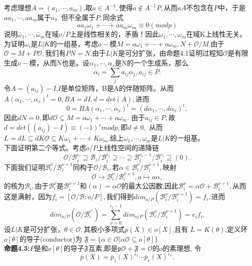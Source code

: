 \documentclass[UTF8]{article}
\begin{document}
考虑理想$A=(a_{1},\cdots,a_{m})$,取$a\in A^{-1},$使得$a\notin A^{-1}P,$从而$aA$不包含在$P$中，于是$aa_{1},\cdots,aa_{m}$属于o，但不全属于$P,$同余式
$$
aa_{1}\omega_{1}+\cdots+aa_{m}\omega_{m}\equiv 0 (mod p)
$$
说明$\bar{\omega}_{1},\cdots ,\bar{\omega}_{m}$在域$o/P$上是线性相关的，矛盾！因此$\omega_{1},\cdots,\omega_{m}$在域K上线性无关。\\
为证明$\omega_{i}$是$L|K$的一组基，考虑$o-$模$M=o\omega_{1}+\cdots+o\omega_{m},N+\mathcal{O}/M.$由于$\mathcal{O}=M+P\mathcal{O},$我们有$PN=N.$由于$L|K$是可分扩张，由命题4.1证明过程知$\mathcal{O}$是有限生成$o-$模，从而N也是。设$\alpha_{1},\cdots,\alpha_{s}$是N的一个生成系，那么
$$
\alpha_{i}=\sum_{j}a_{ij}\alpha_{j},a_{ij}\in P.
$$
令$A=(a_{ij})-I$,$I$是单位矩阵，B是A的伴随矩阵。从而$A(\alpha_{1},\cdots,\alpha_{s})^{t}=0,BA=dI,d=det(A),$进而
$$
0=BA(\alpha_{1},\cdots,\alpha_{s})^{t}=(d\alpha_{1},\cdots,d\alpha_{s})^{t},
$$
因此$dN=0,$即$d\mathcal{O}\subseteq M=o\omega_{1}+\cdots+o\omega_{m}.$
由于$a_{ij}\in P,$故$d=det((a_{ij})-I)\equiv (-1)^{s}mod p,$即$d\neq 0,$
从而$L=dL\subseteq dK\mathcal{O}\subseteq K\omega_{1}+\cdots+K\omega_{m}.$综上$\omega_{1},\cdots,\omega_{m}$是$L|K$的一组基。\\
下面证明第二个等式。考虑$o/P$上线性空间的递降链
$$
\mathcal{O}/\mathcal{B}_{i}^{e_{i}}\supseteq\mathcal{B}_{i}/\mathcal{B}_{i}^{e_{i}}\supseteq \cdots \supseteq \mathcal{B}_{i}^{e_{i}-1}/\mathcal{B}_{i}^{e_{i}}\supseteq (0).
$$
下面我们证明$\mathcal{B}_{i}^{\nu}/\mathcal{B}_{i}^{\nu+1}$同构于$\mathcal{O}/\mathcal{B}_{i},$若$\alpha \in \mathcal{B}_{i}^{\nu}/\mathcal{B}_{i}^{\nu+1},$映射$$
\mathcal{O}\rightarrow \mathcal{B}_{i}^{\nu}/\mathcal{B}_{i}^{\nu+1},a\mapsto a\alpha ,
$$的核为$\mathcal{B}_{i},$由于$\mathcal{B}_{i}^{\nu}$是$\mathcal{B}_{i}^{\nu+1}$和$(\alpha)=\alpha\mathcal{O}$的最大公因数,因此$\mathcal{B}_{i}^{\nu}=\alpha\mathcal{O}+\mathcal{B}_{i}^{\nu+1},$从而这是满射，因为$f_{i}=[\mathcal{O}/\mathcal{B}:o/P],$我们得到$dim_{o/P}(\mathcal{B}_{i}^{\nu}/\mathcal{B}_{i}^{\nu+1})=f_{i},$进而$$
dim_{o/P}(\mathcal{O}/\mathcal{B}_{i}^{e^{i}})=\sum_{\nu=0}^{e_{i}-1}dim_{o/P}(\mathcal{B}_{i}^{\nu}/\mathcal{B}_{i}^{\nu+1})=e_{i}f_{i}.
$$
设$L|K$是可分扩张，$\theta\in\mathcal{O},$其极小多项式$p(X)\in o[X]$,且有
$L=K(\theta)$,定义环$o[\theta]$的导子(conductor)为
$\mathfrak{F}=\{\alpha\in \mathcal{O}|\alpha\mathcal{O}\subseteq o[\theta]\}.$\\
\textbf{命题4.3:}$P$是和$o[\theta]$的导子$\mathfrak{F}$互素,即是$\mathfrak{p}\mathcal{O}+\mathfrak{F}=\mathcal{O}$的o的素理想,
 令$$
    \bar{p}(X)=\bar{p}_{1}(X)^{e_{1}}\cdots\bar{p}_{r}(X)^{e_{r}}.  $$
\end{document}
